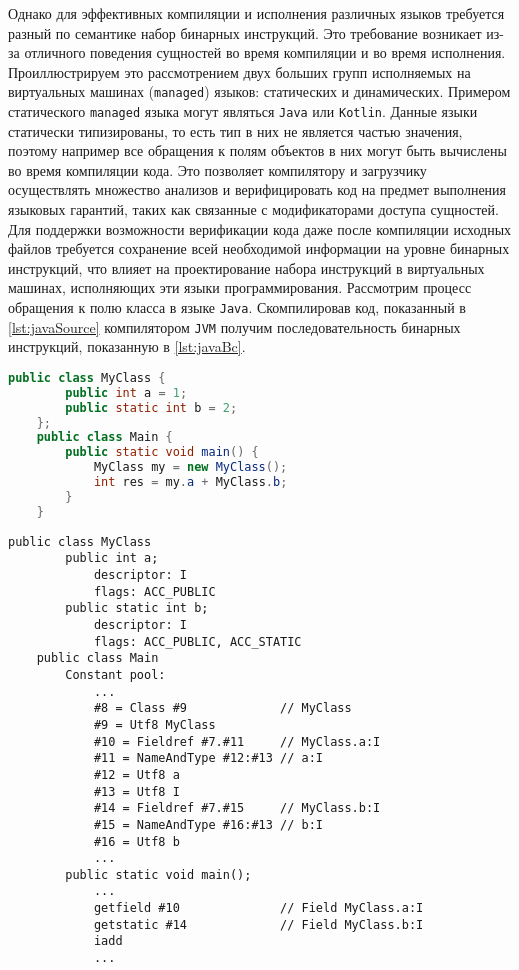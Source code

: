 Однако для эффективных компиляции и исполнения различных языков требуется разный по семантике набор бинарных инструкций. Это требование возникает из-за отличного поведения сущностей во время компиляции и во время исполнения. Проиллюстрируем это рассмотрением двух больших групп исполняемых на виртуальных машинах (\texttt{managed}) языков: статических и динамических. Примером статического \texttt{managed} языка могут являться \texttt{Java} или \texttt{Kotlin}. Данные языки статически типизированы, то есть тип в них не является частью значения, поэтому например все обращения к полям объектов в них могут быть вычислены во время компиляции кода. Это позволяет компилятору и загрузчику осуществлять множество анализов и верифицировать код на предмет выполнения языковых гарантий, таких как связанные с модификаторами доступа сущностей. Для поддержки возможности верификации кода даже после компиляции исходных файлов требуется сохранение всей необходимой информации на уровне бинарных инструкций, что влияет на проектирование набора инструкций в виртуальных машинах, исполняющих эти языки программирования. Рассмотрим процесс обращения к полю класса в языке \texttt{Java}. Скомпилировав код, показанный в \autoref{lst:javaSource} компилятором \texttt{JVM} получим последовательность бинарных инструкций, показанную в \autoref{lst:javaBc}.

\begin{lstlisting}[language=Java, caption=Исходный код языка \texttt{Java}., label=lst:javaSource]
    public class MyClass {
        public int a = 1;
        public static int b = 2;
    };
    public class Main {
        public static void main() {
            MyClass my = new MyClass();
            int res = my.a + MyClass.b;
        }
    }
\end{lstlisting}

\begin{lstlisting}[caption=Бинарный код виртуальной машины \texttt{JVM}., label=lst:javaBc]
    public class MyClass
        public int a;
            descriptor: I
            flags: ACC_PUBLIC
        public static int b;
            descriptor: I
            flags: ACC_PUBLIC, ACC_STATIC
    public class Main
        Constant pool:
            ...
            #8 = Class #9             // MyClass
            #9 = Utf8 MyClass
            #10 = Fieldref #7.#11     // MyClass.a:I
            #11 = NameAndType #12:#13 // a:I
            #12 = Utf8 a
            #13 = Utf8 I
            #14 = Fieldref #7.#15     // MyClass.b:I
            #15 = NameAndType #16:#13 // b:I
            #16 = Utf8 b
            ...
        public static void main();
            ...
            getfield #10              // Field MyClass.a:I
            getstatic #14             // Field MyClass.b:I
            iadd
            ...
\end{lstlisting}

